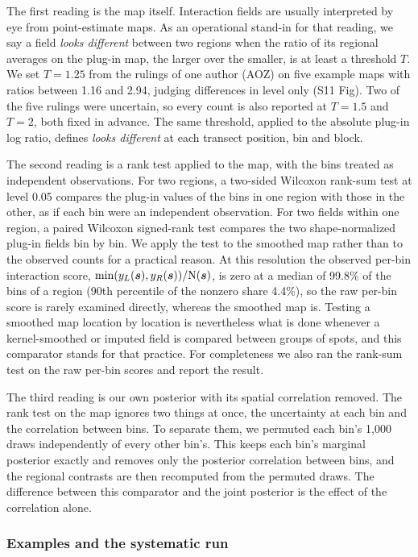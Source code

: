 \documentclass[10pt,letterpaper]{article}
\begin{document}
The first reading is the map itself. Interaction fields are usually interpreted by eye from point-estimate maps. As an operational stand-in for that reading, we say a field \textit{looks different} between two regions when the ratio of its regional averages on the plug-in map, the larger over the smaller, is at least a threshold $T$. We set $T = 1.25$ from the rulings of one author (AOZ) on five example maps with ratios between 1.16 and 2.94, judging differences in level only (S11 Fig). Two of the five rulings were uncertain, so every count is also reported at $T = 1.5$ and $T = 2$, both fixed in advance. The same threshold, applied to the absolute plug-in log ratio, defines \textit{looks different} at each transect position, bin and block.

The second reading is a rank test applied to the map, with the bins treated as independent observations. For two regions, a two-sided Wilcoxon rank-sum test at level 0.05 compares the plug-in values of the bins in one region with those in the other, as if each bin were an independent observation. For two fields within one region, a paired Wilcoxon signed-rank test compares the two shape-normalized plug-in fields bin by bin. We apply the test to the smoothed map rather than to the observed counts for a practical reason. At this resolution the observed per-bin interaction score, $\min(y_L(\mbox{\boldmath $s$}), y_R(\mbox{\boldmath $s$})) / \mbox{N}(\mbox{\boldmath $s$})$, is zero at a median of 99.8\% of the bins of a region (90th percentile of the nonzero share 4.4\%), so the raw per-bin score is rarely examined directly, whereas the smoothed map is. Testing a smoothed map location by location is nevertheless what is done whenever a kernel-smoothed or imputed field is compared between groups of spots, and this comparator stands for that practice. For completeness we also ran the rank-sum test on the raw per-bin scores and report the result.

The third reading is our own posterior with its spatial correlation removed. The rank test on the map ignores two things at once, the uncertainty at each bin and the correlation between bins. To separate them, we permuted each bin's 1,000 draws independently of every other bin's. This keeps each bin's marginal posterior exactly and removes only the posterior correlation between bins, and the regional contrasts are then recomputed from the permuted draws. The difference between this comparator and the joint posterior is the effect of the correlation alone.

\subsubsection*{Examples and the systematic run}
\end{document}

